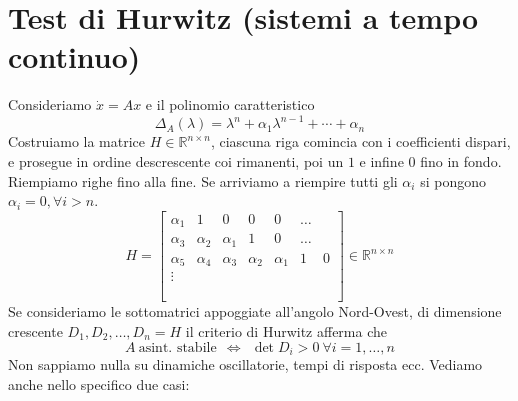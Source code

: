 \section{Test di Hurwitz (sistemi a tempo continuo)}

Consideriamo $\dot{x} =Ax$ e il polinomio caratteristico
\begin{equation*}
	\Delta _A\left(\lambda \right) =\lambda ^n +\alpha _1 \lambda ^{n-1} +\cdots +\alpha _n
\end{equation*}
Costruiamo la matrice $H\in \mathbb{R}^{n\times n}$, ciascuna riga comincia con i coefficienti dispari, e prosegue in ordine descrescente coi rimanenti, poi un $1$ e infine $0$ fino in fondo. Riempiamo righe fino alla fine. Se arriviamo a riempire tutti gli $\alpha _i$ si pongono $\alpha _i =0,\forall i >n$.
\begin{equation*}
	H=\begin{bmatrix}
	\alpha _1 & 1 & 0 & 0 & 0 & \dotsc  & \\
	\alpha _3 & \alpha _2 & \alpha _1 & 1 & 0 & \dotsc  & \\
	\alpha _5 & \alpha _4 & \alpha _3 & \alpha _2 & \alpha _1 & 1 & 0\\
	\vdots  &  &  &  &  &  & \\
	&  &  &  &  &  & \\
	&  &  &  &  &  & \\
	&  &  &  &  &  & 
	\end{bmatrix} \in \mathbb{R}^{n\times n}
\end{equation*}
Se consideriamo le sottomatrici appoggiate all'angolo Nord-Ovest, di dimensione crescente $D_1 ,D_2 ,\dotsc ,D_n =H$ il criterio di Hurwitz afferma che
\begin{equation*}
	\boxed{A\ \text{asint. stabile} \ \ \iff \ \ \det D_i  >0\ \forall i=1,\dotsc ,n}
\end{equation*}
Non sappiamo nulla su dinamiche oscillatorie, tempi di risposta ecc. Vediamo anche nello specifico due casi:
